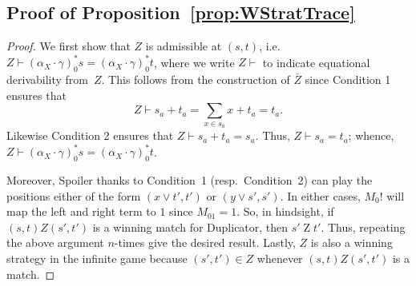 \documentclass[sigconf,
			final%
			nonacm
                        ]{acmart}
\numberwithin{equation}{section}
\numberwithin{equation}{section}
\theoremstyle{plain}
\theoremstyle{definition}
\newcommand{\mybar}[3]{%
  \mathrlap{\hspace{#2}\overline{\scalebox{#1}[1]{\hphantom{\ensuremath{#3}}\vphantom{\rule{0pt}{5.5pt}}}}}\ensuremath{#3}
}
\newcommand{\barM}{\mybar{0.8}{2pt}{M}_1}
\DeclareMathOperator{\Terms}{\mathscr{T}}
\newcommand{\Termsarg}[1]{\Terms_{\!#1}}
\begin{document}
\subsection*{Proof of Proposition~\ref{prop:WStratTrace}}
\begin{proof}
  We first show that $Z$ is admissible at $(s,t)$,
  i.e.~$Z \vdash (\alpha_X\cdot\gamma)^*_0 s=
  (\alpha_X\cdot\gamma)^*_0t$, where we write $Z\vdash$ to indicate
  equational derivability from~$Z$. This follows from the construction
  of $\bar Z$ since Condition 1 ensures that
  \[
  Z \vdash s_{a} + t_{a} = \sum_{x\in s_{a}} x + t_{a} = t_{a}.
  \]
  Likewise Condition 2 ensures that $Z \vdash s_a + t_a = s_a$. Thus, $Z \vdash s_a=t_a$; whence, $Z \vdash (\alpha_X\cdot\gamma)^*_0s=(\alpha_X\cdot\gamma)^*_0 t$.

  Moreover, Spoiler thanks to Condition~1 (resp.~Condition~2) can play
  the positions either of the form $(x\lor t',t')$ or $(y\lor
  s',s')$. In either cases, $M_0!$ will map the left and right term to
  $1$ since $M_01=1$. So, in hindsight, if $(s,t) Z (s',t')$ is a
  winning match for Duplicator, then $s'\mathrel Z t'$. Thus,
  repeating the above argument $n$-times give the desired
  result. Lastly, $Z$ is also a winning strategy in the infinite game
  because $(s',t')\in Z$ whenever $(s,t) Z (s',t')$ is a match.
\end{proof}

\end{document}
